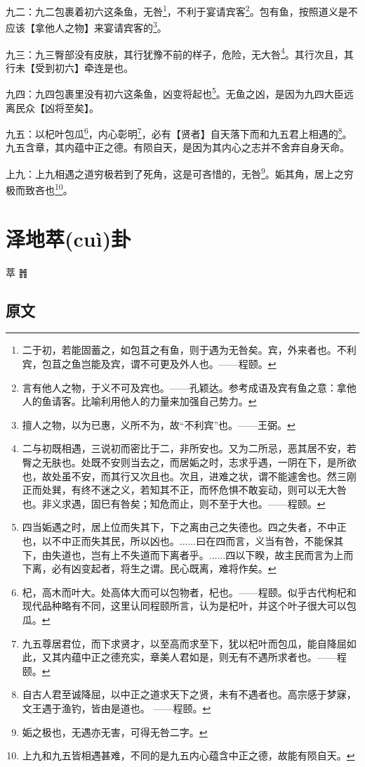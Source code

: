 \documentclass[12pt,oneside]{book}
\begin{document}
九二：九二包裹着初六这条鱼，无咎\footnote{二于初，若能固蓄之，如包苴之有鱼，则于遇为无咎矣。宾，外来者也。不利宾，包苴之鱼岂能及宾，谓不可更及外人也。——程颐。}，不利于宴请宾客\footnote{言有他人之物，于义不可及宾也。——孔颖达。参考成语及宾有鱼之意：拿他人的鱼请客。比喻利用他人的力量来加强自己势力。}。包有鱼，按照道义是不应该【拿他人之物】来宴请宾客的\footnote{擅人之物，以为已惠，义所不为，故“不利宾”也。——王弼。}。

九三：九三臀部没有皮肤，其行犹豫不前的样子，危险，无大咎\footnote{二与初既相遇，三说初而密比于二，非所安也。又为二所忌，恶其居不安，若臀之无肤也。处既不安则当去之，而居姤之时，志求乎遇，一阴在下，是所欲也，故处虽不安，而其行又次且也。次且，进难之状，谓不能遽舍也。然三刚正而处巽，有终不迷之义，若知其不正，而怀危惧不敢妄动，则可以无大咎也。非义求遇，固巳有咎矣；知危而止，则不至于大也。——程颐。}。其行次且，其行未【受到初六】牵连是也。

九四：九四包裹里没有初六这条鱼，凶变将起也\footnote{四当姤遇之时，居上位而失其下，下之离由己之失德也。四之失者，不中正也，以不中正而失其民，所以凶也。......曰在四而言，义当有咎，不能保其下，由失道也，岂有上不失道而下离者乎。......四以下睽，故主民而言为上而下离，必有凶变起者，将生之谓。民心既离，难将作矣。}。无鱼之凶，是因为九四大臣远离民众【凶将至矣】。

九五：以杞叶包瓜\footnote{杞，高木而叶大。处高体大而可以包物者，杞也。——程颐。似乎古代枸杞和现代品种略有不同，这里认同程颐所言，认为是杞叶，并这个叶子很大可以包瓜。}，内心彰明\footnote{九五尊居君位，而下求贤才，以至高而求至下，犹以杞叶而包瓜，能自降屈如此，又其内蕴中正之德充实，章美人君如是，则无有不遇所求者也。——程颐。}，必有【贤者】自天落下而和九五君上相遇的\footnote{自古人君至诚降屈，以中正之道求天下之贤，未有不遇者也。高宗感于梦寐，文王遇于渔钓，皆由是道也。 ——程颐。}。九五含章，其内蕴中正之德。有陨自天，是因为其内心之志并不舍弃自身天命。

上九：上九相遇之道穷极若到了死角，这是可吝惜的，无咎\footnote{姤之极也，无遇亦无害，可得无咎二字。}。姤其角，居上之穷极而致吝也\footnote{上九和九五皆相遇甚难，不同的是九五内心蕴含中正之德，故能有陨自天。}。



\chapter{泽地萃(cuì)卦}
萃 {\Large ䷬}
\section{原文}
\end{document}
